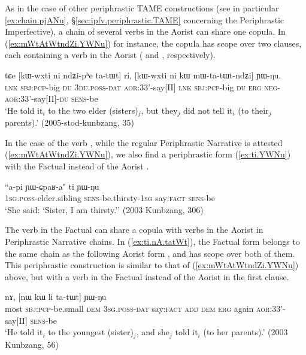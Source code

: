 As in the case of other periphrastic TAME constructions (see in particular \ref{ex:chain.pjANu}, §\ref{sec:ipfv.periphrastic.TAME} concerning the Periphrastic Imperfective), a chain of several verbs in the Aorist can share one copula. In (\ref{ex:mWtAtWtndZi.YWNu}) for instance, the copula  has scope over two clauses, each containing a verb in the Aorist ( and , respectively).

\begin{exe}
\ex \label{ex:mWtAtWtndZi.YWNu}
\gll tɕe [kɯ-wxti ni ndʑi-pʰe ta-tɯt] ri, [kɯ-wxti ni kɯ mɯ-ta-tɯt-ndʑi] ɲɯ-ŋu. \\
\textsc{lnk} \textsc{sbj}:\textsc{pcp}-big \textsc{du} \textsc{3du}.\textsc{poss}-\textsc{dat} \textsc{aor}:3\fl{}3'-say[II] \textsc{lnk} \textsc{sbj}:\textsc{pcp}-big \textsc{du} \textsc{erg} \textsc{neg}-\textsc{aor}:3\fl{}3'-say[II]-\textsc{du} \textsc{sens}-be \\
\glt `He told it$_i$ to the two elder (sisters)$_j$, but they$_j$ did not tell it$_i$ (to their$_j$ parents).' (2005-stod-kunbzang, 35)
\end{exe}

In the case of the verb , while the regular Periphrastic Narrative is attested (\ref{ex:mWtAtWtndZi.YWNu}), we also find a periphrastic form  (\ref{ex:ti.YWNu}) with the Factual  instead of the Aorist .

\begin{exe}
\ex \label{ex:ti.YWNu}
\gll ``a-pi ɲɯ-ɕpaʁ-a" ti ɲɯ-ŋu \\
\textsc{1sg}.\textsc{poss}-elder.sibling \textsc{sens}-be.thirsty-\textsc{1sg} say:\textsc{fact} \textsc{sens}-be \\
\glt `She said: `Sister, I am thirsty.'' (2003 Kunbzang, 306)
\end{exe}

The verb  in the Factual can share a copula with verbs in the Aorist in Periphrastic Narrative chains. In (\ref{ex:ti.nA.tatWt}), the Factual form  belongs to the same chain as the following Aorist form , and  has scope over both of them. This periphrastic construction is similar to that of (\ref{ex:mWtAtWtndZi.YWNu}) above, but with a verb in the Factual instead of the Aorist in the first clause.

\begin{exe}
\ex \label{ex:ti.nA.tatWt}
 nɤ, [nɯ kɯ li ta-tɯt] ɲɯ-ŋu \\
most \textsc{sbj}:\textsc{pcp}-be.small \textsc{dem} \textsc{3sg}.\textsc{poss}-\textsc{dat} say:\textsc{fact} \textsc{add} \textsc{dem} \textsc{erg} again \textsc{aor}:3\fl{}3'-say[II] \textsc{sens}-be \\
\glt `He told it$_i$ to the youngest (sister)$_j$, and she$_j$ told it$_i$ (to her parents).' (2003 Kunbzang, 56)
\end{exe}
 
